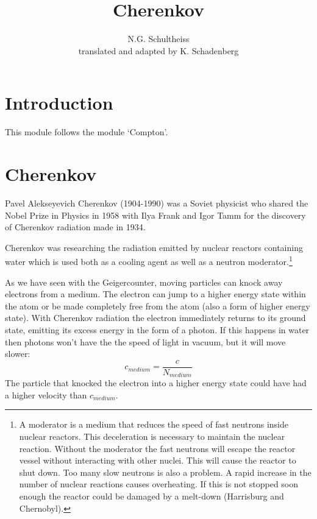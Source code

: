 


\author{N.G. Schultheiss \\ translated and adapted by K. Schadenberg}
\date{}
\title{Cherenkov}



\maketitle

\section{Introduction}
This module follows the module `Compton'.

\section{Cherenkov}
Pavel Alekseyevich Cherenkov (1904-1990) was a Soviet physicist who shared the Nobel Prize in Physics in 1958 with Ilya Frank and Igor Tamm for the discovery of Cherenkov radiation made in 1934.

Cherenkov was researching the radiation emitted by nuclear reactors containing water which is used both as a cooling agent as well as a neutron moderator.\footnote{A moderator is a medium that reduces the speed of fast neutrons inside nuclear reactors. This deceleration is necessary to maintain the nuclear reaction. Without the moderator the fast neutrons will escape the reactor vessel without interacting with other nuclei. This will cause the reactor to shut down. Too many slow neutrons is also a problem. A rapid increase in the number of nuclear reactions causes overheating. If this is not stopped soon enough the reactor could be damaged by a melt-down (Harrisburg and Chernobyl).}

As we have seen with the Geigercounter, moving particles can knock away electrons from a medium. The electron can jump to a higher energy state within the atom or be made completely free from the atom (also a form of higher energy state). With Cherenkov radiation the electron immediately returns to its ground state, emitting its excess energy in the form of a photon. If this happens in water then photons won't have the the speed of light in vacuum, but it will move slower:
\begin{equation*}
c_{medium} = \frac{c}{N_{medium}}
\end{equation*}
The particle that knocked the electron into a higher energy state could have had a higher velocity than $c_{medium}$.


